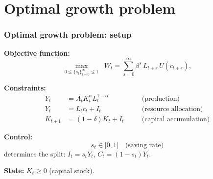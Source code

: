 \documentclass[xcolor=x11names,compress,aspectratio=169]{beamer}%
\makeatletter
\renewenvironment{itemize}{\begin{compactitemize}[<+-| alert@+>]}{\end{compactitemize}}
\makeatother
\begin{document}
\section{Optimal growth problem}%

\begin{frame}%
%

\frametitle{Optimal growth problem: setup}%


\begin{itemize}
\item \textbf{Objective function:}
\[
\max_{0\leq\{s_{t}\}_{t=0}^{\infty}\leq1}\;\;W_{t}=\sum_{s=0}^{\infty}%
\beta^{s}\,L_{t+s}\,U(c_{t+s}),
\]


\item \textbf{Constraints:}
\begin{align*}
Y_{t}  &  =A_{t}K_{t}^{\alpha}L_{t}^{1-\alpha}\quad &  &  \text{(production)}%
\\
Y_{t}  &  =L_{t}c_{t}+I_{t}\quad &  &  \text{(resource allocation)}\\
K_{t+1}  &  =(1-\delta)K_{t}+I_{t}\quad &  &  \text{(capital accumulation)}%
\end{align*}
\vspace{0.4cm}

\item \textbf{Control:}
\[
s_{t}\in\lbrack0,1]\quad\text{(saving rate)}%
\]
determines the split: $I_{t}=s_{t}Y_{t}$, $C_{t}=(1-s_{t})Y_{t}$.
\vspace{0.3cm}

\item \textbf{State:} $K_{t}\geq0$ (capital stock).
\end{itemize}

%

\transboxout
\end{frame}%
%
\end{document}
